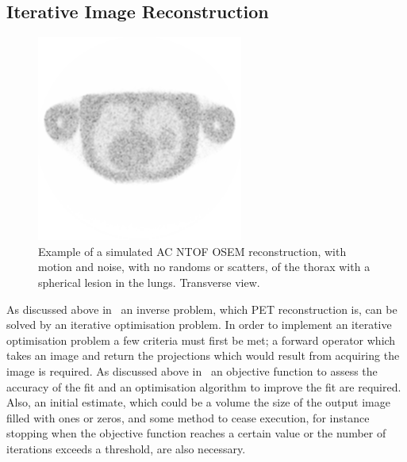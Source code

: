         \subsection{Iterative Image Reconstruction} \label{sec:iterative_image_reconstruction}
            \begin{figure}
                \centering
                
                \includegraphics[width=1.0\linewidth]{figures/background_osem_example.png}
                
                \captionsetup{singlelinecheck=false, justification=raggedright}
                \caption{Example of a simulated \gls{AC} \gls{NTOF} \gls{OSEM} reconstruction, with motion and noise, with no randoms or scatters, of the thorax with a spherical lesion in the lungs. Transverse view.}
                \label{fig:iterative_image_reconstruction_osem_example}
            \end{figure}
            
            As discussed above in~ an inverse problem, which \gls{PET} reconstruction is, can be solved by an iterative optimisation problem. In order to implement an iterative optimisation problem a few criteria must first be met; a forward operator which takes an image and return the projections which would result from acquiring the image is required. As discussed above in~ an objective function to assess the accuracy of the fit and an optimisation algorithm to improve the fit are required. Also, an initial estimate, which could be a volume the size of the output image filled with ones or zeros, and some method to cease execution, for instance stopping when the objective function reaches a certain value or the number of iterations exceeds a threshold, are also necessary.
            
